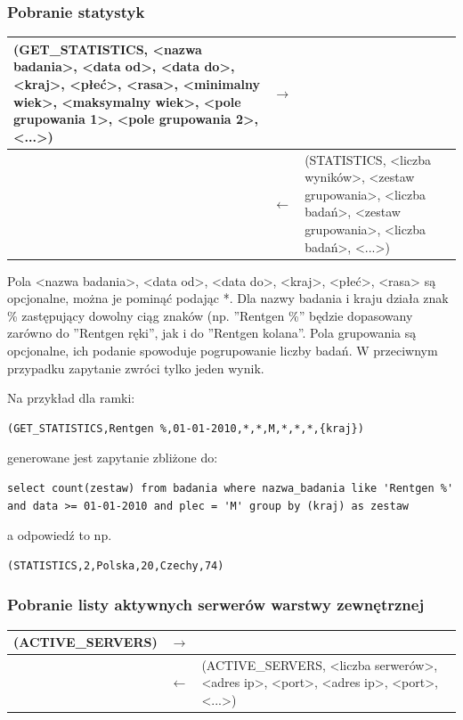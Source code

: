 \subsubsection{Pobranie statystyk}

\begin{longtable}{| p{} | p{}| p{} |} 
\hline
(GET\_STATISTICS, <nazwa badania>, <data od>, <data do>, <kraj>, <płeć>, <rasa>, <minimalny wiek>, <maksymalny wiek>, {<pole grupowania 1>, <pole grupowania 2>, <...>}) & $\rightarrow$ &  \\ \hline
 & $\leftarrow$ & (STATISTICS, <liczba wyników>, <zestaw grupowania>, <liczba badań>, <zestaw grupowania>, <liczba badań>, <...>) \\ \hline
\end{longtable}

Pola <nazwa badania>, <data od>, <data do>, <kraj>, <płeć>, <rasa> są opcjonalne, można je pominąć podając *. Dla nazwy badania i kraju działa znak \% zastępujący dowolny ciąg znaków (np. ''Rentgen \%'' będzie dopasowany zarówno do ''Rentgen ręki'', jak i do ''Rentgen kolana''.
Pola grupowania są opcjonalne, ich podanie spowoduje pogrupowanie liczby badań. W przeciwnym przypadku zapytanie zwróci tylko jeden wynik.

Na przykład dla ramki:
\begin{lstlisting}[style=incode]
(GET_STATISTICS,Rentgen %,01-01-2010,*,*,M,*,*,*,{kraj})
\end{lstlisting}
generowane jest zapytanie zbliżone do:
\begin{lstlisting}[style=incode]
select count(zestaw) from badania where nazwa_badania like 'Rentgen %'
and data >= 01-01-2010 and plec = 'M' group by (kraj) as zestaw
\end{lstlisting}
a odpowiedź to np.
\begin{lstlisting}[style=incode]
(STATISTICS,2,Polska,20,Czechy,74)
\end{lstlisting}

\subsubsection{Pobranie listy aktywnych serwerów warstwy zewnętrznej}

\begin{longtable}{| p{} | p{}| p{} |} 
\hline
(ACTIVE\_SERVERS) & $\rightarrow$ &  \\ \hline
 & $\leftarrow$ & (ACTIVE\_SERVERS, <liczba serwerów>, <adres ip>, <port>, <adres ip>, <port>, <...>) \\ \hline
\end{longtable}

